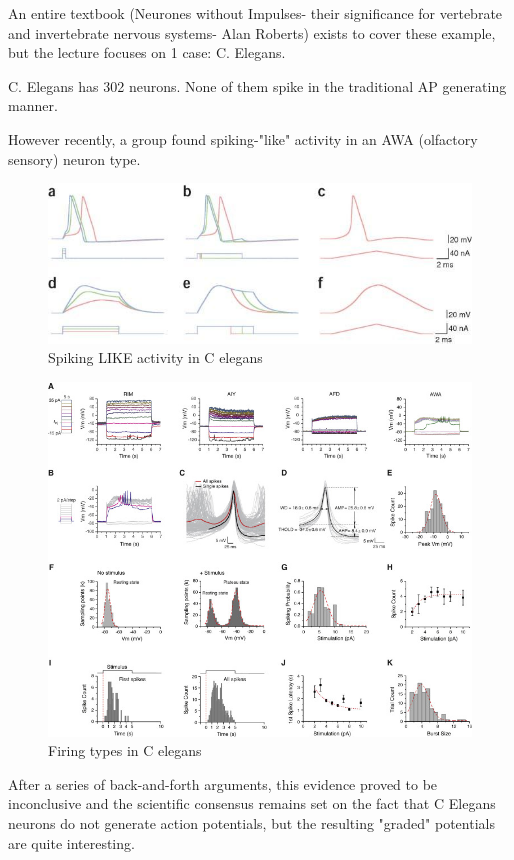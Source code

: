 \documentclass[main]{subfiles}
\begin{document}
An entire textbook (Neurones without Impulses- their significance for vertebrate and invertebrate nervous systems- Alan Roberts) exists to cover these example, but the lecture focuses on 1 case: C. Elegans.

C. Elegans has 302 neurons. None of them spike in the traditional AP generating manner. 

However recently, a group found spiking-"like" activity in an AWA (olfactory sensory) neuron type.


\begin{figure}[H]
	\centering
	\includegraphics[width=0.9\linewidth]{09_WhySpikes/figures/celegans.jpg}
	\caption{Spiking LIKE activity in C elegans}
\end{figure}

\begin{figure}[H]
	\centering
	\includegraphics[width=0.9\linewidth]{09_WhySpikes/figures/celegans-different-neurons.jpg}
	\caption{Firing types in C elegans}
\end{figure}

After a series of back-and-forth arguments, this evidence proved to be inconclusive and the scientific consensus remains set on the fact that C Elegans neurons do not generate action potentials, but the resulting "graded" potentials are quite interesting.
\end{document}
